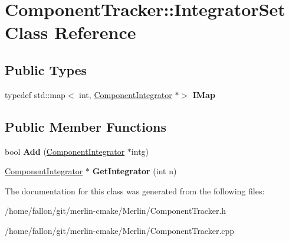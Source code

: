 \hypertarget{classComponentTracker_1_1IntegratorSet}{}\section{Component\+Tracker\+:\+:Integrator\+Set Class Reference}
\label{classComponentTracker_1_1IntegratorSet}
\subsection*{Public Types}
\begin{DoxyCompactItemize}
\item 
\mbox{\label{classComponentTracker_1_1IntegratorSet_ada5c8ec2cf4a0342bd0091b3746e987e}} 
typedef std\+::map$<$ int, \hyperlink{classComponentIntegrator}{Component\+Integrator} $\ast$$>$ {\bfseries I\+Map}
\end{DoxyCompactItemize}
\subsection*{Public Member Functions}
\begin{DoxyCompactItemize}
\item 
\mbox{\label{classComponentTracker_1_1IntegratorSet_ab840beb3b67f5e176b1a5eef2bccfa1a}} 
bool {\bfseries Add} (\hyperlink{classComponentIntegrator}{Component\+Integrator} $\ast$intg)
\item 
\mbox{\label{classComponentTracker_1_1IntegratorSet_a76cf4819fc1ff1843b77d1632e173a3e}} 
\hyperlink{classComponentIntegrator}{Component\+Integrator} $\ast$ {\bfseries Get\+Integrator} (int n)
\end{DoxyCompactItemize}


The documentation for this class was generated from the following files\+:\begin{DoxyCompactItemize}
\item 
/home/fallon/git/merlin-\/cmake/\+Merlin/Component\+Tracker.\+h\item 
/home/fallon/git/merlin-\/cmake/\+Merlin/Component\+Tracker.\+cpp\end{DoxyCompactItemize}
